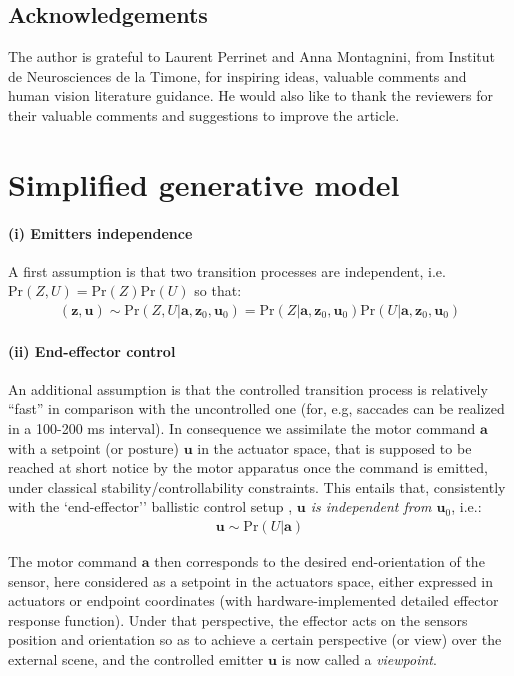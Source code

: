 \documentclass[12pt,twoside,openright]{article}
\begin{document}
\subsection*{Acknowledgements}
The author is grateful to Laurent Perrinet and Anna Montagnini, from Institut de Neurosciences de la Timone, for inspiring ideas, valuable comments and human vision literature guidance.  He would also like to thank the reviewers for their valuable comments and suggestions to improve the article.

\appendix

\section{Simplified generative model}\label{app:mixed}
\paragraph{(i) Emitters independence}
A first assumption is that two transition processes are independent, i.e. $\text{Pr}(Z,U) = \text{Pr}(Z)\text{Pr}(U)$ so that:
\begin{align}
(\boldsymbol{z},\boldsymbol{u}) \sim \text{Pr}(Z,U|\boldsymbol{a}, \boldsymbol{z}_0, \boldsymbol{u}_0) = \text{Pr}(Z|\boldsymbol{a}, \boldsymbol{z}_0, \boldsymbol{u}_0) \text{Pr}(U|\boldsymbol{a}, \boldsymbol{z}_0, \boldsymbol{u}_0)\nonumber
\end{align}

\paragraph{(ii) End-effector control}
An additional assumption is that the controlled transition process is relatively ``fast'' in comparison with the uncontrolled one
(for, e.g, saccades can be realized in a 100-200 ms interval). 
In consequence we assimilate the motor command $\boldsymbol{a}$ with a setpoint (or posture) $\boldsymbol{u}$ in the actuator space, that is supposed to be reached 
at short notice by the motor apparatus once the command is emitted, under classical stability/controllability constraints.
This entails that, consistently with the `end-effector'' ballistic control setup \citep{mussa2004neural},  \emph{$\boldsymbol{u}$ is independent from $\boldsymbol{u}_0$},
i.e.:
\begin{align*}
\boldsymbol{u}\sim\text{Pr}(U|\boldsymbol{a})
\end{align*}

The motor command $\boldsymbol{a}$ then corresponds to the desired end-orientation of the sensor,
here considered as a setpoint in the actuators space, 
either expressed in actuators or endpoint coordinates (with hardware-implemented detailed effector response function).  
Under that perspective, the effector acts on the sensors position and orientation so as to achieve a certain perspective (or view) over the external scene, and the controlled emitter $\boldsymbol{u}$ is now called a \emph{viewpoint}. 
\end{document}
